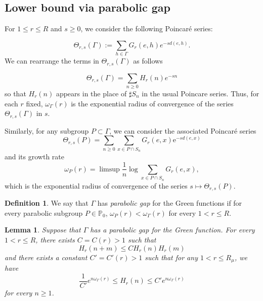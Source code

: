 \documentclass{amsart}
\newtheorem{lem}[thm]{Lemma}
\theoremstyle{definition}
\newtheorem{defn}[thm]{Definition}
\theoremstyle{remark}
\begin{document}
\subsection{Lower bound via parabolic gap} 

For $1\le r\le R$ and $s\ge 0$, we consider the following Poincar\'e series:

\begin{equation}\label{defPoincareseries}
\Theta_{r, s}(\Gamma) := \sum_{h\in \Gamma} G_r(e, h) e^{-sd(e, h)}.
\end{equation}
 We can rearrange the terms in $\Theta_{r, s}(\Gamma)$ as follows

$$\Theta_{r, s}(\Gamma) = \sum_{n\ge 0} H_r(n) e^{-sn}$$
so that  $H_r(n)$ appears in the place of $\sharp S_n$ in the usual Poincare series. Thus, for each $r$ fixed, $\omega_\Gamma(r)$ is the exponential radius of convergence of the series $\Theta_{r, s}(\Gamma)$ in $s$.



Similarly, for any subgroup $P\subset \Gamma$, we can consider the associated Poincar\'e series
$$\Theta_{r, s}(P)=\sum_{n\geq 0}\sum_{x\in P\cap S_n}G_r(e,x)\mathrm{e}^{-sd(e,x)}$$ and its growth rate
$$ \omega_P(r)=\limsup \frac{1}{n}\log \sum_{x\in P\cap S_n}G_r(e,x),$$
which is the exponential radius of convergence of the series $s\mapsto \Theta_{r,s}(P)$.

\begin{defn}
We say that $\Gamma$ has \textit{parabolic gap}   for the Green functions if for every parabolic subgroup $P\in \mathbb{P}_0$, $\omega_P(r)<\omega_\Gamma(r)$ for every $1< r\le R$.
\end{defn}


\begin{lem}\label{LowerBDLem}
Suppose that $\Gamma$ has a parabolic gap for the Green function.
For every $1<r\leq R$, there exists $C=C(r)>1$ such that 
$$H_{r} (n+m) \le C H_r(n) H_r(m)
$$
and there exists a constant $C'=C'(r)>1$ such that for any $1<r\le R_\mu$, we have 
$$
\frac{1}{C'} e^{n \omega_\Gamma(r)}\le H_r(n)\le C' e^{n \omega_\Gamma(r)}
$$
for every $n\ge 1$.
\end{lem}
\end{document}

